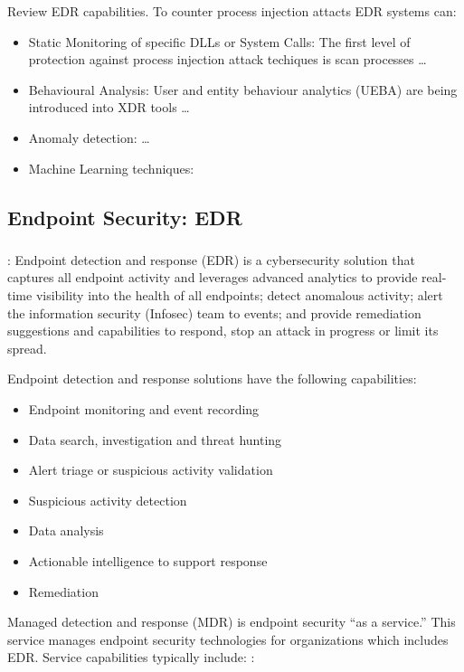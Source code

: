 \documentclass{article}
\begin{document}
Review EDR capabilities.  To counter process injection attacts EDR systems can:

\begin{itemize}
\item Static Monitoring of specific DLLs or System Calls: The first level of protection against process injection attack techiques is
  scan processes \ldots
\item Behavioural Analysis: User and entity behaviour analytics (UEBA) are being introduced into XDR tools \ldots
\item Anomaly detection: \autocite{Pek:2016} \ldots
\item Machine Learning techniques: \autocite{Wang:2022}
\end{itemize}



\subsection{Endpoint Security: EDR}

\subsubsection{\textcite{Hayes:2023}}
\textbf{}:  Endpoint detection and response (EDR) is a cybersecurity solution that captures all endpoint activity and leverages advanced analytics to provide real-time visibility into the health of all endpoints; detect anomalous activity; alert the information security (Infosec) team to events; and provide remediation suggestions and capabilities to respond, stop an attack in progress or limit its spread.

Endpoint detection and response solutions have the following capabilities:

\begin{itemize}
\item	Endpoint monitoring and event recording
\item	Data search, investigation and threat hunting
\item	Alert triage or suspicious activity validation
\item	Suspicious activity detection
\item	Data analysis
\item	Actionable intelligence to support response
\item	Remediation
\end{itemize}

Managed detection and response (MDR) is endpoint security “as a service.” This  service manages endpoint security technologies for organizations which includes EDR. Service capabilities typically include: :
\end{document}
